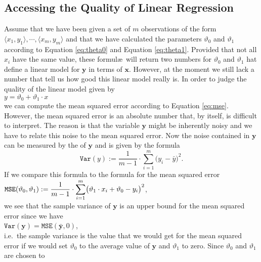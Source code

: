 \subsection{Accessing the Quality of Linear Regression}
Assume that we have been given a set of $m$ observations of the form $\langle x_1, y_1\rangle, \cdots, \langle x_m, y_m\rangle$  
and that we have calculated the parameters $\vartheta_0$ and $\vartheta_1$ according to Equation
\ref{eq:theta0} and Equation \ref{eq:theta1}.  Provided that not all $x_i$ have the same value, these
formul\ae\ will return two numbers for $\vartheta_0$ and $\vartheta_1$ hat define a linear model for
$\mathbf{y}$ in terms of $\mathbf{x}$.  However, at the moment we still lack a number that tell us how good
this linear model really is.  In order to judge the quality of the linear model given by 
\\[0.2cm]
\hspace*{1.3cm}
$y = \vartheta_0 + \vartheta_1 \cdot x$
\\[0.2cm]
we can compute the mean squared error according to Equation \ref{eq:mse}.  However, the mean squared error 
is an absolute number that, by itself, is difficult to interpret.  The reason is that the variable $\mathbf{y}$ might be
inherently noisy and we have to relate this noise to the mean squared error.  Now the noise contained in $\mathbf{y}$
can be measured by the  of $\mathbf{y}$ and is given by the formula
\begin{equation}
  \label{eq:var}
  \mathtt{Var}(y) := \frac{1}{m-1} \cdot \sum\limits_{i=1}^m \bigl(y_i - \bar{y}\bigr)^2.
\end{equation}
If we compare this formula to the formula for the mean squared error
\\[0.2cm]
\hspace*{1.3cm}
$\displaystyle\mathtt{MSE}(\vartheta_0, \vartheta_1) := 
  \frac{1}{m-1} \cdot\sum\limits_{i=1}^m \bigl(\vartheta_1 \cdot x_i + \vartheta_0 - y_i\bigr)^2
$,
\\[0.2cm]
we see that the sample variance of $\mathbf{y}$ is an upper bound for the mean squared error since we have
\\[0.2cm]
\hspace*{1.3cm}
$\mathtt{Var}(\mathbf{y}) = \mathtt{MSE}(\bar{\mathbf{y}}, 0)$,
\\[0.2cm]
i.e.~the sample variance is the value that we would get for the mean squared error if we would set $\vartheta_0$ to
the average value of $\mathbf{y}$ and $\vartheta_1$ to zero.  Since $\vartheta_0$ and $\vartheta_1$ are chosen to
